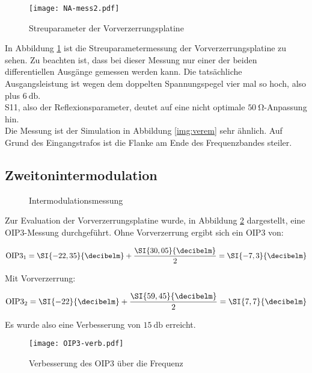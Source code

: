 \begin{figure}[H]
	\centering
	\texttt{[image: NA-mess2.pdf]}
	\caption{Streuparameter der Vorverzerrungsplatine}
	\label{img:svor}
\end{figure}

In Abbildung \ref{img:svor} ist die Streuparametermessung der Vorverzerrungsplatine zu sehen. Zu beachten ist, dass bei dieser Messung nur einer der beiden differentiellen Ausgänge gemessen werden kann. Die tatsächliche Ausgangsleistung ist wegen dem doppelten Spannungspegel vier mal so hoch, also plus $\SI{6}{\decibel}$.\\
S11, also der Reflexionsparameter, deutet auf eine nicht optimale $\SI{50}{\ohm}$-Anpassung hin.\\
Die Messung ist der Simulation in Abbildung \ref{img:verem} sehr ähnlich. Auf Grund des Eingangstrafos ist die Flanke am Ende des Frequenzbandes steiler.

\subsection{Zweitonintermodulation}

\begin{figure}[H]
\raggedright
\raggedleft
\caption{Intermodulationsmessung} 
\label{img:inter}
\end{figure}

Zur Evaluation der Vorverzerrungsplatine wurde, in Abbildung \ref{img:inter} dargestellt, eine \ac{OIP3}-Messung durchgeführt. Ohne Vorverzerrung ergibt sich ein \ac{OIP3} von:

\begin{equation}
\text{OIP3}_1 = \SI{-22,{}35}{\decibelm}+\frac{\SI{30,{}05}{\decibelm}}{2}=\SI{-7,{}3}{\decibelm}
\end{equation}

Mit Vorverzerrung:

\begin{equation}
\text{OIP3}_2 = \SI{-22}{\decibelm}+\frac{\SI{59,{}45}{\decibelm}}{2}=\SI{7,{}7}{\decibelm}
\end{equation}

Es wurde also eine Verbesserung von $\SI{15}{\decibel}$ erreicht.

\begin{figure}[H]
	\centering
	\texttt{[image: OIP3-verb.pdf]}
	\caption{Verbesserung des \ac{OIP3} über die Frequenz}
	\label{img:verboip3}
\end{figure}


